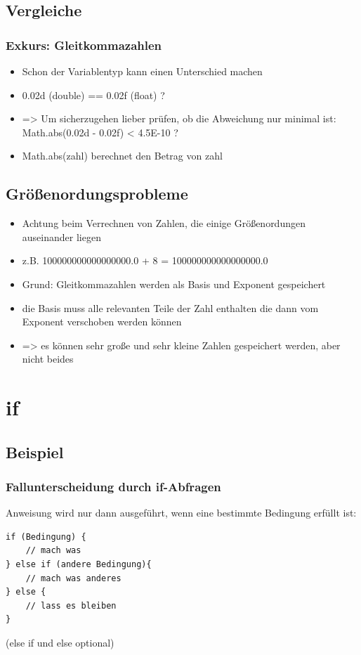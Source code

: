 \documentclass[final]{beamer}
\begin{document}
\subsection{Vergleiche}
\begin{frame}
	\frametitle{Exkurs: Gleitkommazahlen}
	\begin{itemize}
		\item{Schon der Variablentyp kann einen Unterschied machen}
		\item{0.02d (double) == 0.02f (float) ?}
		\item{=> Um sicherzugehen lieber prüfen, ob die Abweichung nur minimal ist: \\
		Math.abs(0.02d - 0.02f) < 4.5E-10 ?}
		\item{Math.abs(zahl) berechnet den Betrag von zahl}
	\end{itemize}
\end{frame}

\subsection{Größenordungsprobleme}
\begin{frame}
	\begin{itemize}
		\item{Achtung beim Verrechnen von Zahlen, die einige Größenordungen auseinander liegen}
		\item{z.B. 100000000000000000.0 + 8 = 100000000000000000.0}
		\item{Grund: Gleitkommazahlen werden als Basis und Exponent gespeichert}
		\item{die Basis muss alle relevanten Teile der Zahl enthalten die dann vom Exponent verschoben werden können}
		\item{=> es können sehr große und sehr kleine Zahlen gespeichert werden, aber nicht beides}
	\end{itemize}
\end{frame}

\section{if}
\subsection{Beispiel}
\begin{frame}[containsverbatim]
	\frametitle{Fallunterscheidung durch if-Abfragen}
	Anweisung wird nur dann ausgeführt, wenn eine bestimmte Bedingung erfüllt ist:
	\begin{lstlisting}
if (Bedingung) {
	// mach was
} else if (andere Bedingung){
	// mach was anderes
} else {
	// lass es bleiben
}
	\end{lstlisting}
	(else if und else optional)
\end{frame}
\end{document}

